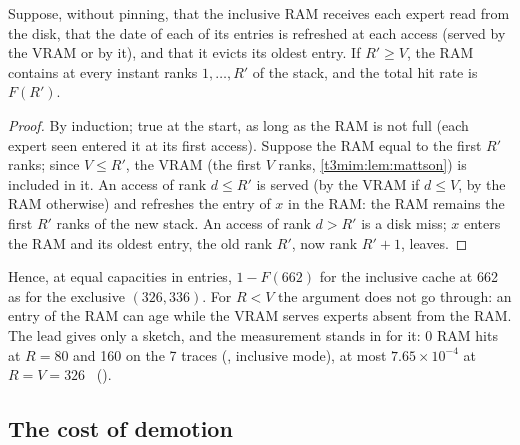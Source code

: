 \begin{proposition}\label{t3mim:prop:inclusif}
Suppose, without pinning, that the inclusive RAM receives each expert read from the disk, that the date of each of its entries is refreshed at each access (served by the VRAM or by it), and that it evicts its oldest entry. If $R' \ge V$, the RAM contains at every instant ranks $1, \dots, R'$ of the stack, and the total hit rate is $F(R')$.
\end{proposition}
\begin{proof}
By induction; true at the start, as long as the RAM is not full (each expert seen entered it at its first access). Suppose the RAM equal to the first $R'$ ranks; since $V \le R'$, the VRAM (the first $V$ ranks, \cref{t3mim:lem:mattson}) is included in it. An access of rank $d \le R'$ is served (by the VRAM if $d \le V$, by the RAM otherwise) and refreshes the entry of $x$ in the RAM: the RAM remains the first $R'$ ranks of the new stack. An access of rank $d > R'$ is a disk miss; $x$ enters the RAM and its oldest entry, the old rank $R'$, now rank $R'+1$, leaves.
\end{proof}
Hence, at equal capacities in entries, $1 - F(662)$ for the inclusive cache at 662 as for the exclusive $(326, 336)$. For $R < V$ the argument does not go through: an entry of the RAM can age while the VRAM serves experts absent from the RAM. The lead gives only a sketch, and the measurement stands in for it: 0 RAM hits at $R = 80$ and 160 on the 7 traces (, inclusive mode), at most $7.65 \times 10^{-4}$ at $R = V = 326$ \mes~().

\subsection{The cost of demotion}\label{t3mim:sec:p2-cout}

